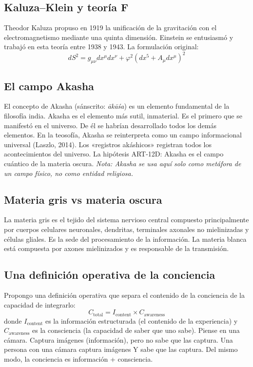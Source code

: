 \documentclass[11pt,a4paper]{article}
\begin{document}
\subsection{Kaluza--Klein y teoría F}
Theodor Kaluza propuso en 1919 la unificación de la gravitación con el electromagnetismo mediante una quinta dimensión. Einstein se entusiasmó y trabajó en esta teoría entre 1938 y 1943. La formulación original:
\begin{equation}
dS^2 = g_{\mu\nu} dx^\mu dx^\nu + \varphi^2(dx^5 + A_{\mu} dx^\mu)^2
\end{equation}

\subsection{El campo Akasha}
El concepto de Akasha (sánscrito: \emph{ākāśa}) es un elemento fundamental de la filosofía india. Akasha es el elemento más sutil, inmaterial. Es el primero que se manifestó en el universo. De él se habrían desarrollado todos los demás elementos. En la teosofía, Akasha se reinterpreta como un campo informacional universal (Laszlo, 2014). Los «registros akáshicos» registran todos los acontecimientos del universo. La hipótesis ART-12D: Akasha es el campo cuántico de la materia oscura. \textit{Nota: Akasha se usa aquí solo como metáfora de un campo físico, no como entidad religiosa.}

\subsection{Materia gris vs materia oscura}
La materia gris es el tejido del sistema nervioso central compuesto principalmente por cuerpos celulares neuronales, dendritas, terminales axonales no mielinizadas y células gliales. Es la sede del procesamiento de la información. La materia blanca está compuesta por axones mielinizados y es responsable de la transmisión.

\subsection{Una definición operativa de la conciencia}
Propongo una definición operativa que separa el contenido de la conciencia de la capacidad de integrarlo:
\begin{equation}
C_{\text{total}} = I_{\text{content}} \times C_{\text{awareness}}
\end{equation}
donde $I_{\text{content}}$ es la información estructurada (el contenido de la experiencia) y $C_{\text{awareness}}$ es la consciencia (la capacidad de saber que uno sabe). Piense en una cámara. Captura imágenes (información), pero no sabe que las captura. Una persona con una cámara captura imágenes Y sabe que las captura. Del mismo modo, la conciencia es información + consciencia.
\end{document}
